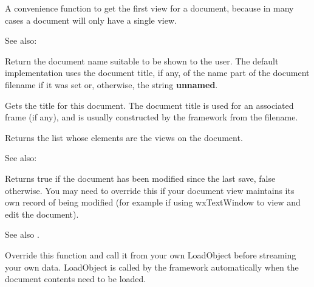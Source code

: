 A convenience function to get the first view for a document, because
in many cases a document will only have a single view.

See also: 

\label{wxdocumentgetuserreadablentablename}


Return the document name suitable to be shown to the user. The default
implementation uses the document title, if any, of the name part of the
document filename if it was set or, otherwise, the string {\bf unnamed}.

\label{wxdocumentgettitle}


Gets the title for this document. The document title is used for an associated
frame (if any), and is usually constructed by the framework from
the filename.

\label{wxdocumentgetviews}


Returns the list whose elements are the views on the document.

See also: 

\label{wxdocumentismodified}


Returns true if the document has been modified since the last save, false otherwise.
You may need to override this if your document view maintains its own
record of being modified (for example if using wxTextWindow to view and edit the document).

See also .

\label{wxdocumentloadobject}



Override this function and call it from your own LoadObject before
streaming your own data. LoadObject is called by the framework
automatically when the document contents need to be loaded.

